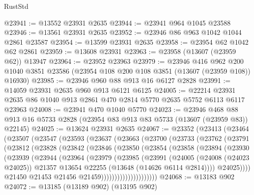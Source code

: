 \begin{lexlean}{RustStd}
\begin{coremodule}
@23941 := @13552 @23931 @2635
@23944 := @23941 @964 @1045 @23588
@23946 := @13561 @23931 @2635
@23952 := @23946 @86 @963 @1042 @1044 @2861 @23587
@23954 := @13599 @23931 @2635
@23958 := @23954 @62 @1042 @62 @2861
@23959 := @13608 @23931
@23963 := @23958 (@13607 (@23959 @62)) @13947
@23964 := @23952 @23963
@23979 := @23946
    @416
    @962
    @200
    @1040
    @3851
    @23586
    (@23954 @108 @200 @108 @3851 (@13607 (@23959 @108)) @16930)
@23985 := @23946 @960 @88 @913 @16 @6127 @2828
@23991 := @14059 @23931 @2635 @960 @913 @6121 @6125
@24005 := @22214 @23931 @2635 @86 @1040 @913 @2861 @470 @2814 @5770 @2635 @5752 @6113 @6117 @23963
@24008 := @23941 @470 @1040 @5770
@24023 := @23946
    @468
    @88
    @913
    @16
    @5733
    @2828
    (@23954 @83 @913 @83 @5733 (@13607 (@23959 @83)) @22145)
@24025 := @13624 @23931 @2635
@24067 := @23352
    (@23413
      (@23464
        (@23507
          (@23547
            (@23593
              (@23637
                (@23663
                  (@23700
                    (@23733
                      (@23762
                        (@23791
                          (@23812
                            (@23828
                              (@23842
                                (@23846
                                  (@23850
                                    (@23854
                                      (@23858
                                        (@23894
                                          (@23930
                                            (@23939
                                              (@23944
                                                (@23964
                                                  (@23979
                                                    (@23985
                                                      (@23991
                                                        (@24005
                                                          (@24008 (@24023 @24025))
                                                          @21357
                                                          @13654
                                                          @22255
                                                          (@13648 (@14626 @6114 @2814))))
                                                      @24025))))
                                              @21450
                                              @21453
                                              @21456
                                              @21459)))))))))))))))))))))
@24068 := @13183 @902
@24072 := @13185 (@13189 @902) (@13195 @902)

\end{coremodule}
\end{lexlean}
